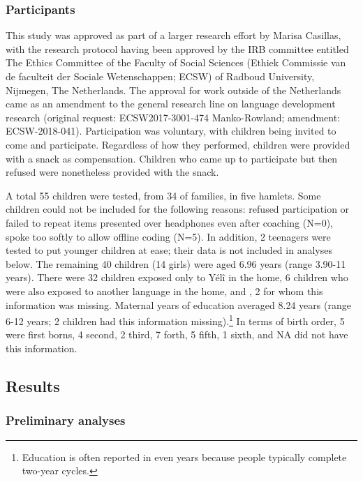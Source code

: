 \documentclass[english,,man,floatsintext]{apa6}
\begin{document}
\subsubsection{Participants}\label{participants}

This study was approved as part of a larger research effort by Marisa
Casillas, with the research protocol having been approved by the IRB
committee entitled The Ethics Committee of the Faculty of Social
Sciences (Ethiek Commissie van de faculteit der Sociale Wetenschappen;
ECSW) of Radboud University, Nijmegen, The Netherlands. The approval for
work outside of the Netherlands came as an amendment to the general
research line on language development research (original request:
ECSW2017-3001-474 Manko-Rowland; amendment: ECSW-2018-041).
Participation was voluntary, with children being invited to come and
participate. Regardless of how they performed, children were provided
with a snack as compensation. Children who came up to participate but
then refused were nonetheless provided with the snack.

A total 55 children were tested, from 34 of families, in five hamlets.
Some children could not be included for the following reasons: refused
participation or failed to repeat items presented over headphones even
after coaching (N=0), spoke too softly to allow offline coding (N=5). In
addition, 2 teenagers were tested to put younger children at ease; their
data is not included in analyses below. The remaining 40 children (14
girls) were aged 6.96 years (range 3.90-11 years). There were 32
children exposed only to Yélî in the home, 6 children who were also
exposed to another language in the home, and , 2 for whom this
information was missing. Maternal years of education averaged 8.24 years
(range 6-12 years; 2 children had this information missing).\footnote{Education
  is often reported in even years because people typically complete
  two-year cycles.} In terms of birth order, 5 were first borns, 4
second, 2 third, 7 forth, 5 fifth, 1 sixth, and NA did not have this
information.

\subsection{Results}\label{results}

\subsubsection{Preliminary analyses}\label{preliminary-analyses}
\end{document}
